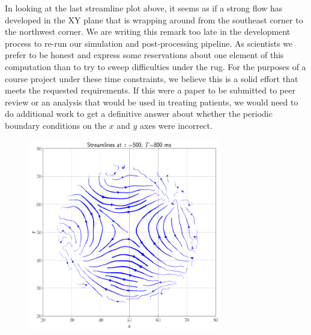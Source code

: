 \documentclass[11pt]{article} %
\begin{document}
In looking at the last streamline plot above, it seems as if a strong flow has developed
in the XY plane that is wrapping around from the southeast corner to the northwest corner.
We are writing this remark too late in the development process 
to re-run our simulation and post-processing pipeline.  
As scientists we prefer to be honest and express some reservations about one element of this
computation than to try to sweep difficulties under the rug.
For the purposes of a course project under these time constraints, we believe this is a 
solid effort that meets the requested requirements.  
If this were a paper to be submitted to peer review or an analysis that would be used
in treating patients, we would need to do additional work to get a definitive answer about
whether the periodic boundary conditions on the $x$ and $y$ axes were incorrect.

\begin{figure}[H]
\centering
\hspace*{-0.25in}
\vspace*{-0.50in}
\includegraphics[width=0.75\textwidth]{streamlines/streamlines_z_500_t_800.png}
\end{figure}
\end{document}
